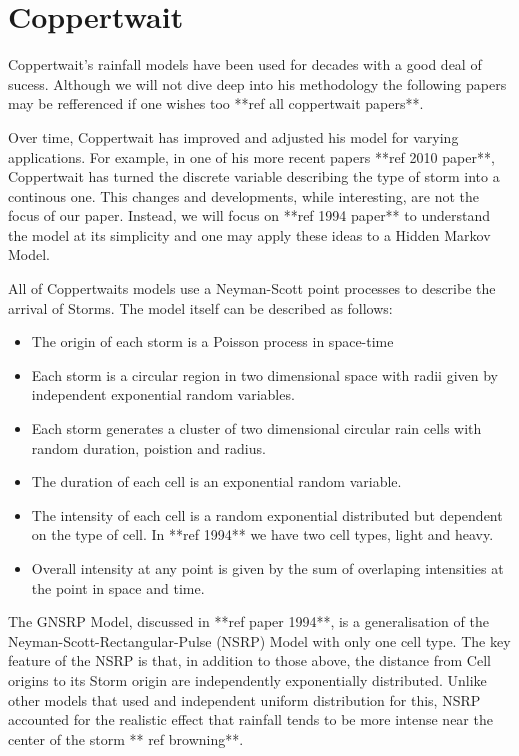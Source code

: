 \section{Coppertwait}
Coppertwait's rainfall models have been used for decades with a good deal of sucess. Although we will not dive deep into his methodology the following papers may be refferenced if one wishes too **ref all coppertwait papers**.

Over time, Coppertwait has improved and adjusted his model for varying applications. For example, in one of his more recent papers **ref 2010 paper**, Coppertwait has turned the discrete variable describing the type of storm into a continous one. This changes and developments, while interesting, are not the focus of our paper. Instead, we will focus on **ref 1994 paper** to understand the model at its simplicity and one may apply these ideas to a Hidden Markov Model. 

All of Coppertwaits models use a Neyman-Scott point processes to describe the arrival of Storms. The model itself can be described as follows:
\begin{itemize}
    \item The origin of each storm is a Poisson process in space-time
    \item Each storm is a circular region in two dimensional space with radii given by independent exponential random variables.
    \item Each storm generates a cluster of two dimensional circular rain cells with random duration, poistion and radius. 
    \item The duration of each cell is an exponential random variable.
    \item The intensity of each cell is a random exponential distributed but dependent on the type of cell. In **ref 1994** we have two cell types, light and heavy.
    \item Overall intensity at any point is given by the sum of overlaping intensities at the point in space and time.
\end{itemize}

The GNSRP Model, discussed in **ref paper 1994**, is a generalisation of the Neyman-Scott-Rectangular-Pulse (NSRP) Model with only one cell type. The key feature of the NSRP is that, in addition to those above, the distance from Cell origins to its Storm origin are independently exponentially distributed. Unlike other models that used and independent uniform distribution for this, NSRP accounted for the realistic effect that rainfall tends to be more intense near the center of the storm ** ref browning**.

